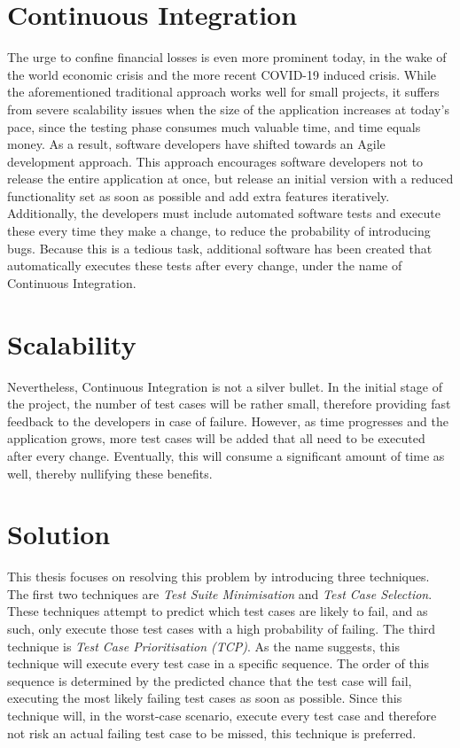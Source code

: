 \section*{Continuous Integration}
The urge to confine financial losses is even more prominent today, in the wake of the world economic crisis and the more recent COVID-19 induced crisis. While the aforementioned traditional approach works well for small projects, it suffers from severe scalability issues when the size of the application increases at today's pace, since the testing phase consumes much valuable time, and time equals money. As a result, software developers have shifted towards an Agile development approach. This approach encourages software developers not to release the entire application at once, but release an initial version with a reduced functionality set as soon as possible and add extra features iteratively. Additionally, the developers must include automated software tests and execute these every time they make a change, to reduce the probability of introducing bugs. Because this is a tedious task, additional software has been created that automatically executes these tests after every change, under the name of Continuous Integration.

\section*{Scalability}
Nevertheless, Continuous Integration is not a silver bullet. In the initial stage of the project, the number of test cases will be rather small, therefore providing fast feedback to the developers in case of failure. However, as time progresses and the application grows, more test cases will be added that all need to be executed after every change. Eventually, this will consume a significant amount of time as well, thereby nullifying these benefits.

\section*{Solution}
This thesis focuses on resolving this problem by introducing three techniques. The first two techniques are \emph{Test Suite Minimisation} and \emph{Test Case Selection}. These techniques attempt to predict which test cases are likely to fail, and as such, only execute those test cases with a high probability of failing. The third technique is \emph{Test Case Prioritisation (TCP)}. As the name suggests, this technique will execute every test case in a specific sequence. The order of this sequence is determined by the predicted chance that the test case will fail, executing the most likely failing test cases as soon as possible. Since this technique will, in the worst-case scenario, execute every test case and therefore not risk an actual failing test case to be missed, this technique is preferred.

